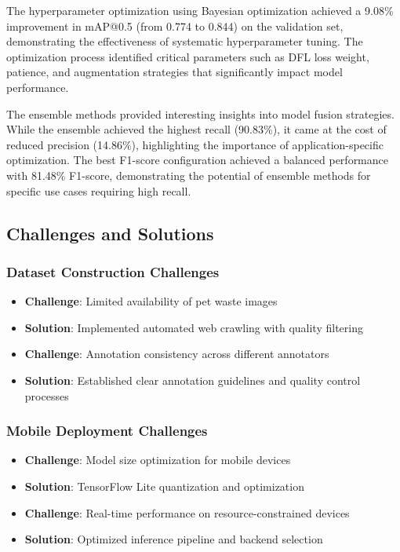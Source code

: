 \documentclass[12pt,a4paper]{article}
\begin{document}
The hyperparameter optimization using Bayesian optimization achieved a 9.08\% improvement in mAP@0.5 (from 0.774 to 0.844) on the validation set, demonstrating the effectiveness of systematic hyperparameter tuning. The optimization process identified critical parameters such as DFL loss weight, patience, and augmentation strategies that significantly impact model performance.

The ensemble methods provided interesting insights into model fusion strategies. While the ensemble achieved the highest recall (90.83\%), it came at the cost of reduced precision (14.86\%), highlighting the importance of application-specific optimization. The best F1-score configuration achieved a balanced performance with 81.48\% F1-score, demonstrating the potential of ensemble methods for specific use cases requiring high recall.

\subsection{Challenges and Solutions}

\subsubsection{Dataset Construction Challenges}
\begin{itemize}
    \item \textbf{Challenge}: Limited availability of pet waste images
    \item \textbf{Solution}: Implemented automated web crawling with quality filtering
    \item \textbf{Challenge}: Annotation consistency across different annotators
    \item \textbf{Solution}: Established clear annotation guidelines and quality control processes
\end{itemize}

\subsubsection{Mobile Deployment Challenges}
\begin{itemize}
    \item \textbf{Challenge}: Model size optimization for mobile devices
    \item \textbf{Solution}: TensorFlow Lite quantization and optimization
    \item \textbf{Challenge}: Real-time performance on resource-constrained devices
    \item \textbf{Solution}: Optimized inference pipeline and backend selection
\end{itemize}
\end{document}
